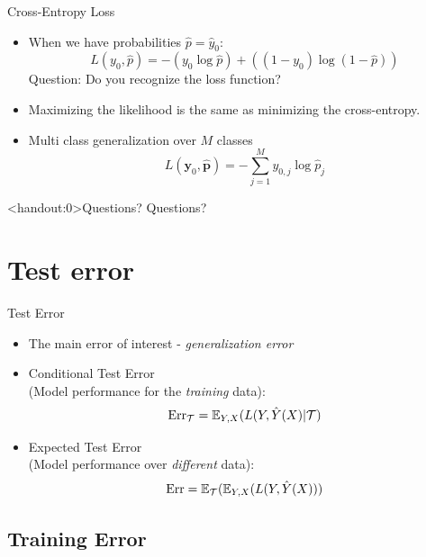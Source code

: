\documentclass[10pt,handout]{beamer}
\begin{document}
\begin{frame}{Cross-Entropy Loss}

\begin{itemize}
\item When we have probabilities $\hat{p}=\hat{y}_0$:
\[
L(y_0, \hat{p}) = - (y_0 \log{\hat{p}}) + ((1 - y_0) \log{(1- \hat{p})})
\]
Question: Do you recognize the loss function?
\pause
\item Maximizing the likelihood is the same as minimizing the cross-entropy. \pause
\item Multi class generalization over $M$ classes
\[
L(\mathbf{y}_0, \hat{\mathbf{p}}) = - \sum^M_{j=1} y_{0,j} \log{\hat{p}_j}
\]
\end{itemize}

\end{frame}


\begin{frame}<handout:0>{Questions?}
Questions?
\end{frame}



\section{Test error}
\frame{\sectionpage}

\begin{frame}{Test Error}

\begin{itemize}
\item The main error of interest - \emph{generalization error}
\item Conditional Test Error \\(Model performance for the \emph{training} data):
\[
\text{Err}_\mathcal{T} = \operatorname{\mathbb{E}}_{Y,X}(L(Y,\hat{Y}(X) | \mathcal{T})
\]
\item Expected Test Error \\(Model performance over \emph{different} data):
\[
\text{Err} = \operatorname{\mathbb{E}}_\mathcal{T}(\operatorname{\mathbb{E}}_{Y,X}(L(Y,\hat{Y}(X)))
\]

\end{itemize}

\end{frame}


\subsection{Training Error}
\end{document}
